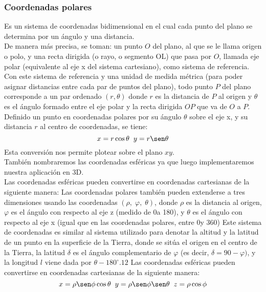 \documentclass[12tp]{article}
\begin{document}
\subsubsection{Coordenadas polares}
Es un sistema de coordenadas bidimensional en el cual cada punto del plano se determina por un ángulo y una distancia.\\
De manera más precisa, se toman: un punto $O$ del plano, al que se le llama origen o polo, y una recta dirigida (o rayo, o segmento OL) 
que pasa por $O$, llamada eje polar (equivalente al eje x del sistema cartesiano), como sistema de referencia. Con este 
sistema de referencia y una unidad de medida métrica (para poder asignar distancias entre cada par de puntos del plano), todo 
punto $P$ del plano corresponde a un par ordenado $(r, \theta)$ donde $r$ es la distancia de $P$ al origen y $\theta$ es el 
ángulo formado entre el eje polar y la recta dirigida $OP$ que va de $O$ a $P$.\\
Definido un punto en coordenadas polares por su ángulo $\theta$ sobre el eje x, y su distancia $r$ al centro de coordenadas, 
se tiene:
\begin{equation}
x= r \cos \theta \;\;
y= r \sen \theta    
\end{equation}
Esta conversión nos permite plotear sobre el plano $xy$.\\
También nombraremos las coordenadas esféricas ya que luego implementaremos nuestra aplicación en 3D.\\
Las coordenadas esféricas pueden convertirse en coordenadas cartesianas de la siguiente manera:
Las coordenadas polares también pueden extenderse a tres dimensiones usando las coordenadas $(\rho,\; \varphi,\; \theta)$, 
donde $\rho$ es la distancia al origen, $\varphi$ es el ángulo con respecto al eje z (medido de 0\textordmasculine a 180\textordmasculine), 
y $\theta$ es el ángulo con respecto al eje x (igual que en las coordenadas polares, entre 0\textordmasculine y 360\textordmasculine) Este sistema de 
coordenadas es similar al sistema utilizado para denotar la altitud y la latitud de un punto en la superficie de la Tierra, 
donde se sitúa el origen en el centro de la Tierra, la latitud $\delta$ es el ángulo complementario de $\varphi$ (es decir, $\delta = 90 - \varphi)$, y la 
longitud $l$ viene dada por $\theta - 180^\circ .12$
Las coordenadas esféricas pueden convertirse en coordenadas cartesianas de la siguiente manera:
\begin{equation}
x = \rho  \sen\phi  \cos\theta \;\;
y = \rho  \sen\phi  \sen\theta \;\;
z = \rho  \cos\phi
\end{equation}
\end{document}
